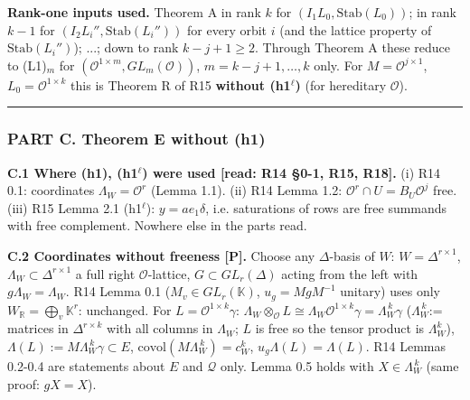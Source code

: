 \textbf{Rank-one inputs used.} Theorem A in rank \(k\) for \((I_1L_0,\mathrm{Stab}(L_0))\); in rank \(k-1\) for \((I_2L_i'',\mathrm{Stab}(L_i''))\) for every orbit \(i\) (and the lattice property of \(\mathrm{Stab}(L_i'')\)); ...; down to rank \(k-j+1\ge2\). Through Theorem A these reduce to (L1)\(_m\) for \((\mathcal O^{1\times m},GL_m(\mathcal O))\), \(m=k-j+1,\dots,k\) only. For \(M=\mathcal O^{j\times1}\), \(L_0=\mathcal O^{1\times k}\) this is Theorem R of R15 \textbf{without (h1\(^\ell\))} (for hereditary \(\mathcal O\)).

\begin{center}\rule{0.5\linewidth}{0.5pt}\end{center}

\hypertarget{part-c.-theorem-e-without-h1}{%
\subsubsection*{PART C. Theorem E without (h1)}\label{part-c.-theorem-e-without-h1}}

\textbf{C.1 Where (h1), (h1\(^\ell\)) were used {[}read: R14 §0-1, R15, R18{]}.} (i) R14 0.1: coordinates \(\Lambda_W=\mathcal O^r\) (Lemma 1.1). (ii) R14 Lemma 1.2: \(\mathcal O^r\cap U=B_U\mathcal O^j\) free. (iii) R15 Lemma 2.1 (h1\(^\ell\)): \(y=ae_1\delta\), i.e. saturations of rows are free summands with free complement. Nowhere else in the parts read.

\textbf{C.2 Coordinates without freeness {[}P{]}.} Choose any \(\Delta\)-basis of \(W\): \(W=\Delta^{r\times1}\), \(\Lambda_W\subset\Delta^{r\times1}\) a full right \(\mathcal O\)-lattice, \(G\subset GL_r(\Delta)\) acting from the left with \(g\Lambda_W=\Lambda_W\). R14 Lemma 0.1 (\(M_v\in GL_r(\mathbb K)\), \(u_g=MgM^{-1}\) unitary) uses only \(W_{\mathbb R}=\bigoplus_v\mathbb K^r\): unchanged. For \(L=\mathcal O^{1\times k}\gamma\): \(\Lambda_W\otimes_{\mathcal O}L\cong\Lambda_W\mathcal O^{1\times k}\gamma=\Lambda_W^{\,k}\gamma\) (\(\Lambda_W^{\,k}\):= matrices in \(\Delta^{r\times k}\) with all columns in \(\Lambda_W\); \(L\) is free so the tensor product is \(\Lambda_W^k\)), \(\Lambda(L):=M\Lambda_W^{\,k}\gamma\subset E\), \(\mathrm{covol}(M\Lambda_W^{\,k})=c_W^k\), \(u_g\Lambda(L)=\Lambda(L)\). R14 Lemmas 0.2-0.4 are statements about \(E\) and \(\mathcal Q\) only. Lemma 0.5 holds with \(X\in\Lambda_W^{\,k}\) (same proof: \(gX=X\)).

